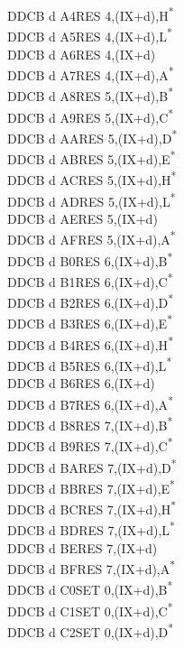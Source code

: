 \documentclass[twoside,openright,a4paper]{book}
\begin{document}
\begin{multicols}{3}
{\begin{tabbing}
	DDCB d A4\>RES 4,(IX+d),H\textsuperscript{*}\\
	DDCB d A5\>RES 4,(IX+d),L\textsuperscript{*}\\
	DDCB d A6\>RES 4,(IX+d)\\
	DDCB d A7\>RES 4,(IX+d),A\textsuperscript{*}\\
	DDCB d A8\>RES 5,(IX+d),B\textsuperscript{*}\\
	DDCB d A9\>RES 5,(IX+d),C\textsuperscript{*}\\
	DDCB d AA\>RES 5,(IX+d),D\textsuperscript{*}\\
	DDCB d AB\>RES 5,(IX+d),E\textsuperscript{*}\\
	DDCB d AC\>RES 5,(IX+d),H\textsuperscript{*}\\
	DDCB d AD\>RES 5,(IX+d),L\textsuperscript{*}\\
	DDCB d AE\>RES 5,(IX+d)\\
	DDCB d AF\>RES 5,(IX+d),A\textsuperscript{*}\\
	DDCB d B0\>RES 6,(IX+d),B\textsuperscript{*}\\
	DDCB d B1\>RES 6,(IX+d),C\textsuperscript{*}\\
	DDCB d B2\>RES 6,(IX+d),D\textsuperscript{*}\\
	DDCB d B3\>RES 6,(IX+d),E\textsuperscript{*}\\
	DDCB d B4\>RES 6,(IX+d),H\textsuperscript{*}\\
	DDCB d B5\>RES 6,(IX+d),L\textsuperscript{*}\\
	DDCB d B6\>RES 6,(IX+d)\\
	DDCB d B7\>RES 6,(IX+d),A\textsuperscript{*}\\
	DDCB d B8\>RES 7,(IX+d),B\textsuperscript{*}\\
	DDCB d B9\>RES 7,(IX+d),C\textsuperscript{*}\\
	DDCB d BA\>RES 7,(IX+d),D\textsuperscript{*}\\
	DDCB d BB\>RES 7,(IX+d),E\textsuperscript{*}\\
	DDCB d BC\>RES 7,(IX+d),H\textsuperscript{*}\\
	DDCB d BD\>RES 7,(IX+d),L\textsuperscript{*}\\
	DDCB d BE\>RES 7,(IX+d)\\
	DDCB d BF\>RES 7,(IX+d),A\textsuperscript{*}\\
	DDCB d C0\>SET 0,(IX+d),B\textsuperscript{*}\\
	DDCB d C1\>SET 0,(IX+d),C\textsuperscript{*}\\
	DDCB d C2\>SET 0,(IX+d),D\textsuperscript{*}\\

\end{tabbing}}
\end{multicols}
\end{document}
